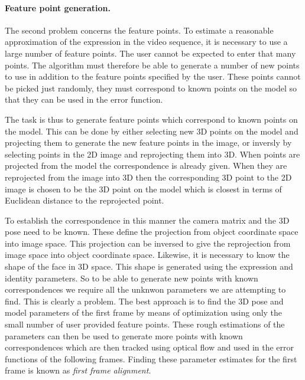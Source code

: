 \documentclass[11pt,a4paper]{report}
\begin{document}
\paragraph{Feature point generation.} The second problem concerns the feature points. To estimate a reasonable approximation of the expression in the
video sequence, it is necessary to use a large number of feature points. The user cannot
be expected to enter that many points. The algorithm must therefore be able to generate
a number of new points to use in addition to the feature points specified
by the user. These points cannot be picked just randomly, they must correspond
to known points on the model so that they can be used in the error
function. 

The task is thus to generate feature points which
correspond to known points on the model. This can be done by either selecting
new 3D points on the model and projecting them to generate the new feature
points in the image, or
inversly by selecting points in the 2D image and reprojecting them into 3D. When
points are projected from the model the correspondence is already given. When
they are reprojected from the image into 3D then the corresponding 3D point to the 2D image
is chosen to be the 3D point on the model which is closest
in terms of Euclidean distance to the reprojected point.

To establish the correspondence in this manner the camera matrix and the 3D pose
need to be
known. These define the projection from object coordinate space into image
space. This projection can be inversed to give the reprojection from image space into
object coordinate space. Likewise, it is necessary to know the shape of the face in 3D space. This
shape is generated using the expression and identity parameters. So to be able
to generate new points with known correspondences we require all the unknwon parameters
we are attempting to find. This is clearly a problem. The best approach is to find the 3D pose and model parameters of the
first frame by means of optimization using only the small number of user provided
feature points. These rough estimations of the parameters can then be used to
generate more points with known correspondences which are then tracked using
optical flow and used in the error functions of the following frames. Finding
these parameter estimates for the first frame is known as \textit{first frame
  alignment}.
\end{document}
